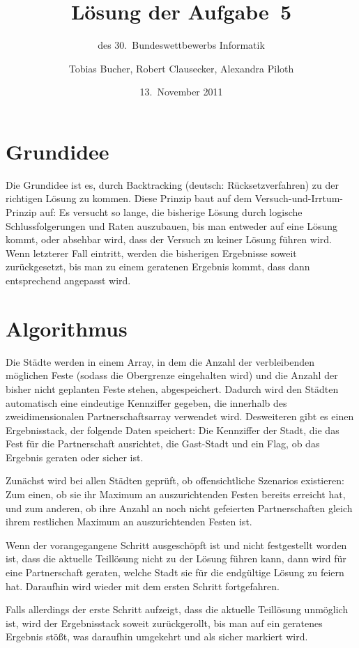\documentclass{scrartcl}
\title{Lösung der Aufgabe~5}
\subtitle{des 30.~Bundeswettbewerbs Informatik}
\author{Tobias Bucher, Robert Clausecker, Alexandra Piloth}
\date{13.~November 2011}
\begin{document}
\maketitle

\section{Grundidee}

Die Grundidee ist es, durch Backtracking (deutsch: Rücksetzverfahren) zu der richtigen Lösung zu kommen. Diese Prinzip baut auf dem Versuch-und-Irrtum-Prinzip auf: Es versucht so lange, die bisherige Lösung durch logische Schlussfolgerungen und Raten auszubauen, bis man entweder auf eine Lösung kommt, oder absehbar wird, dass der Versuch zu keiner Lösung führen wird. Wenn letzterer Fall eintritt, werden die bisherigen Ergebnisse soweit zurückgesetzt, bis man zu einem geratenen Ergebnis kommt, dass dann entsprechend angepasst wird.

\section{Algorithmus}

Die Städte werden in einem Array, in dem die Anzahl der verbleibenden möglichen Feste (sodass die Obergrenze eingehalten wird) und die Anzahl der bisher nicht geplanten Feste stehen, abgespeichert. Dadurch wird den Städten automatisch eine eindeutige Kennziffer gegeben, die innerhalb des zweidimensionalen Partnerschaftsarray verwendet wird. Desweiteren gibt es einen Ergebnisstack, der folgende Daten speichert: Die Kennziffer der Stadt, die das Fest für die Partnerschaft ausrichtet, die Gast-Stadt und ein Flag, ob das Ergebnis geraten oder sicher ist.

Zunächst wird bei allen Städten geprüft, ob offensichtliche Szenarios existieren: Zum einen, ob sie ihr Maximum an auszurichtenden Festen bereits erreicht hat, und zum anderen, ob ihre Anzahl an noch nicht gefeierten Partnerschaften gleich ihrem restlichen Maximum an auszurichtenden Festen ist.

Wenn der vorangegangene Schritt ausgeschöpft ist und nicht festgestellt worden ist, dass die aktuelle Teillösung nicht zu der Lösung führen kann, dann wird für eine Partnerschaft geraten, welche Stadt sie für die endgültige Lösung zu feiern hat. Daraufhin wird wieder mit dem ersten Schritt fortgefahren.

Falls allerdings der erste Schritt aufzeigt, dass die aktuelle Teillösung unmöglich ist, wird der Ergebnisstack soweit zurückgerollt, bis man auf ein geratenes Ergebnis stößt, was daraufhin umgekehrt und als sicher markiert wird.
\end{document}
